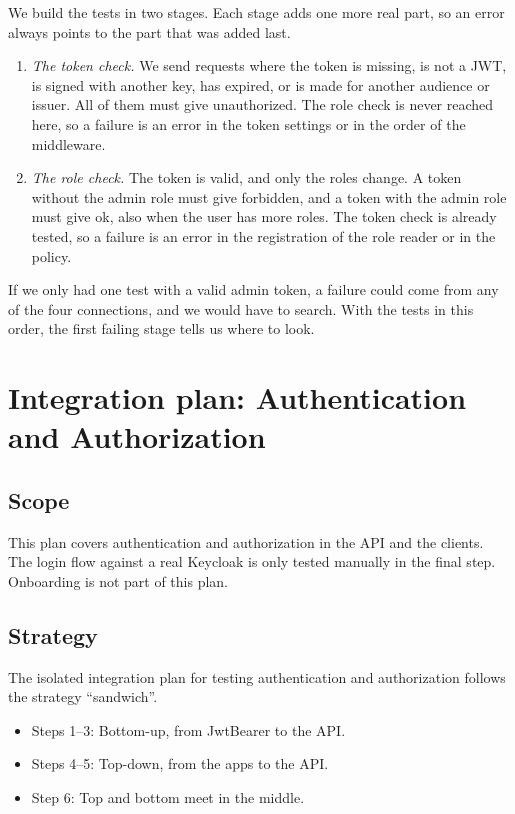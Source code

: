 \documentclass[a4paper,11pt]{article}
\begin{document}
We build the tests in two stages. Each stage adds one more real part, so an error always points to the part that was added last.

\begin{enumerate}
  \item \emph{The token check.} We send requests where the token is missing, is not a JWT, is signed with another key, has expired, or is made for another audience or issuer. All of them must give unauthorized. The role check is never reached here, so a failure is an error in the token settings or in the order of the middleware.
  \item \emph{The role check.} The token is valid, and only the roles change. A token without the admin role must give forbidden, and a token with the admin role must give ok, also when the user has more roles. The token check is already tested, so a failure is an error in the registration of the role reader or in the policy.
\end{enumerate}

If we only had one test with a valid admin token, a failure could come from any of the four connections, and we would have to search. With the tests in this order, the first failing stage tells us where to look.

\section{Integration plan: Authentication and Authorization}
\label{sec:auth-plan}

\subsection{Scope}
This plan covers authentication and authorization in the API and the clients. The login flow against a real Keycloak is only tested manually in the final step. Onboarding is not part of this plan.

\subsection{Strategy}
The isolated integration plan for testing authentication and authorization follows the strategy ``sandwich''.
\begin{itemize}
  \item Steps 1--3: Bottom-up, from JwtBearer to the API.
  \item Steps 4--5: Top-down, from the apps to the API.
  \item Step 6: Top and bottom meet in the middle.
\end{itemize}
\end{document}
